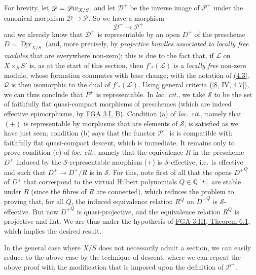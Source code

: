 \documentclass{article}
\newcommand{\oldpage}[1]{\marginpar{\footnotesize$\Big\vert$ \textit{p.~#1}}}
\theoremstyle{definition}
\theoremstyle{definition}
\theoremstyle{definition}
\theoremstyle{definition}
\theoremstyle{remark}
\begin{document}
For brevity, let \({\mathscr{D}}=\mathscr{D}\kern -.5pt iv_{X/S}\), and let \({\mathscr{D}}^+\) be the inverse image of \({\mathscr{P}}^+\) under the canonical morphism \({\mathscr{D}}\to{\mathscr{P}}\).
So we have a morphism
\[
  {\mathscr{D}}^+
  \to {\mathscr{P}}^+
\tag{+}
\]
and we already know that \({\mathscr{D}}^+\) is representable by an open \(D^+\) of the prescheme \(D=\underline{\operatorname{Div}}_{X/S}\) (and, more precisely, by \emph{projective bundles associated to locally free modules} that are everywhere non-zero);
this is due to the fact that, if \({\mathscr{L}}\) on \(X\times_S S'\) is, as at the start of this section, then \(f'_*({\mathscr{L}})\) is a \emph{locally free} non-zero module, whose formation commutes with base change;
with the notation of \protect\hyperlink{fga-3-v-theorem-4.3}{(4.3)}, \({\mathscr{Q}}\) is then isomorphic to the dual of \(f'_*({\mathscr{L}})\).
Using general criteria ({[}\protect\hyperlink{ref-Gro1960a}{8}, IV, 4.7{]}), we can thus conclude that \(P^+\) is representable.
In \emph{loc. cit.}, we take \({\mathcal{S}}\) to be the set of faithfully flat quasi-compact morphisms of preschemes (which are indeed effective epimorphisms, by \protect\hyperlink{fga-3-i-section-B.1}{FGA 3.I, B}).
\oldpage{232-13}Condition (a) of \emph{loc. cit.}, namely that \((+)\) is representable by morphisms that are elements of \({\mathcal{S}}\), is satisfied as we have just seen;
condition (b) says that the functor \({\mathscr{P}}^+\) is is compatible with faithfully flat quasi-compact descent, which is immediate.
It remains only to prove condition (c) of \emph{loc. cit.}, namely that the equivalence \(R\) in the prescheme \(D^+\) induced by the \({\mathcal{S}}\)-representable morphism (\(+\)) is \({\mathcal{S}}\)-effective, i.e.~is effective and such that \(D^+\to D^+/R\) is in \({\mathcal{S}}\).
For this, note first of all that the opens \({D^+}^Q\) of \(D^+\) that correspond to the virtual Hilbert polynomials \(Q\in\mathbb{Q}[t]\) are stable under \(R\) (since the fibres of \(R\) are connected), which reduces the problem to proving that, for all \(Q\), the induced equivalence relation \(R^Q\) on \({D^+}^Q\) is \({\mathcal{S}}\)-effective.
But now \({D^+}^Q\) is quasi-projective, and the equivalence relation \(R^Q\) is projective and flat.
We are thus under the hypothesis of \protect\hyperlink{fga-3-iii-theorem-6.1}{FGA 3.III, Theorem 6.1}, which implies the desired result.

In the general case where \(X/S\) does not necessarily admit a section, we can easily reduce to the above case by the technique of descent, where we can repeat the above proof with the modification that is imposed upon the definition of \({\mathscr{P}}^+\).
\end{document}
